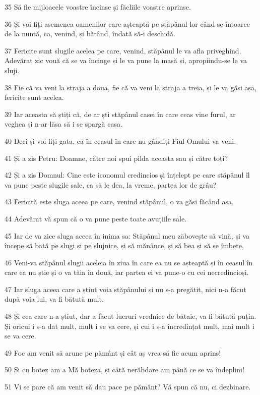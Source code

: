 \par 35 Să fie mijloacele voastre încinse și făcliile voastre aprinse.
\par 36 Și voi fiți asemenea oamenilor care așteaptă pe stăpânul lor când se întoarce de la nuntă, ca, venind, și bătând, îndată să-i deschidă.
\par 37 Fericite sunt slugile acelea pe care, venind, stăpânul le va afla priveghind. Adevărat zic vouă că se va încinge și le va pune la masă și, apropiindu-se le va sluji.
\par 38 Fie că va veni la straja a doua, fie că va veni la straja a treia, și le va găsi așa, fericite sunt acelea.
\par 39 Iar aceasta să știți că, de ar ști stăpânul casei în care ceas vine furul, ar veghea și n-ar lăsa să i se spargă casa.
\par 40 Deci și voi fiți gata, că în ceasul în care nu gândiți Fiul Omului va veni.
\par 41 Și a zis Petru: Doamne, către noi spui pilda aceasta sau și către toți?
\par 42 Și a zis Domnul: Cine este iconomul credincios și înțelept pe care stăpânul îl va pune peste slugile sale, ca să le dea, la vreme, partea lor de grâu?
\par 43 Fericită este sluga aceea pe care, venind stăpânul, o va găsi făcând așa.
\par 44 Adevărat vă spun că o va pune peste toate avuțiile sale.
\par 45 Iar de va zice sluga aceea în inima sa: Stăpânul meu zăbovește să vină, și va începe să bată pe slugi și pe slujnice, și să mănânce, și să bea și să se îmbete,
\par 46 Veni-va stăpânul slugii aceleia în ziua în care ea nu se așteaptă și în ceasul în care ea nu știe și o va tăia în două, iar partea ei va pune-o cu cei necredincioși.
\par 47 Iar sluga aceea care a știut voia stăpânului și nu s-a pregătit, nici n-a făcut după voia lui, va fi bătută mult.
\par 48 Și cea care n-a știut, dar a făcut lucruri vrednice de bătaie, va fi bătută puțin. Și oricui i s-a dat mult, mult i se va cere, și cui i s-a încredințat mult, mai mult i se va cere.
\par 49 Foc am venit să arunc pe pământ și cât aș vrea să fie acum aprins!
\par 50 Și cu botez am a Mă boteza, și câtă nerăbdare am până ce se va îndeplini!
\par 51 Vi se pare că am venit să dau pace pe pământ? Vă spun că nu, ci dezbinare.
